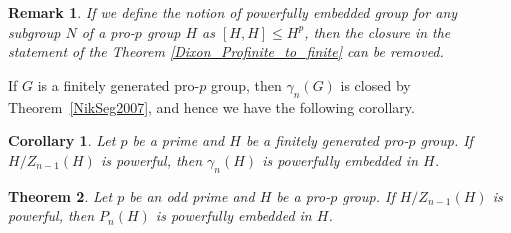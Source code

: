 \documentclass[12pt]{elsarticle}
\newtheorem{theorem}{Theorem}[section]
\newtheorem{corollary}[theorem]{Corollary}
\newtheorem*{main corollary*}{Main Corollary}
\newtheorem{Remark}{Remark}
\theoremstyle{definition}
\begin{document}
\begin{Remark}    
    If we define the notion of powerfully embedded group for any subgroup $N$ of a pro-$p$ group $H$ as $[H,H] \leqslant H^p$, then the closure in the statement of the Theorem \ref{Dixon_Profinite_to_finite} can be removed.
\end{Remark}
      \noindent If $G$ is a finitely generated pro-$p$ group, then $\gamma_n(G)$ is closed by Theorem~\ref{NikSeg2007}, and hence we have the following corollary.
\begin{corollary}
        Let $p$ be a prime and $H$ be a finitely generated pro-$p$ group. If $H/Z_{n-1}(H)$ is powerful, then $\gamma_n(H)$ is powerfully embedded in $H$.
\end{corollary}






\begin{theorem} \label{P_npowerful}
    Let $p$ be an odd prime and $H$ be a pro-$p$ group. If $H/Z_{n-1}(H)$ is powerful, then $P_n(H)$ is powerfully embedded in $H$.
\end{theorem}
\end{document}
